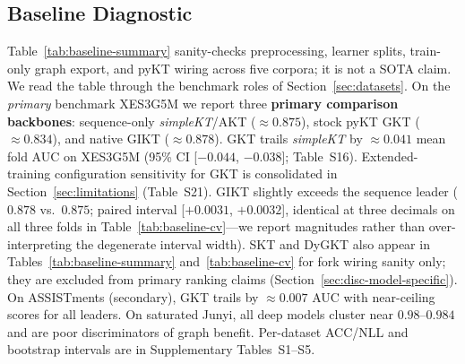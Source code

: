 \documentclass[pdflatex,sn-mathphys-num]{sn-jnl}
\newcommand{\GKTdeltaci}{[$-0.044$, $-0.038$]}
\newcommand{\GIKTdeltaci}{[$+0.0031$, $+0.0032$]}
\begin{document}
\subsection{Baseline Diagnostic}
\label{sec:exp-baseline}

Table~\ref{tab:baseline-summary} sanity-checks preprocessing, learner splits,
train-only graph export, and pyKT wiring across five corpora; it is not a SOTA
claim. We read the table through the benchmark roles of Section~\ref{sec:datasets}.
On the \emph{primary} benchmark XES3G5M we report three \textbf{primary
comparison backbones}: sequence-only \textit{simpleKT}/AKT (${\approx}0.875$),
stock pyKT GKT (${\approx}0.834$), and native GIKT (${\approx}0.878$).
GKT trails \textit{simpleKT} by ${\approx}0.041$ mean fold AUC on XES3G5M
(95\% CI \GKTdeltaci{}; Table~S16). Extended-training configuration
sensitivity for GKT is consolidated in Section~\ref{sec:limitations}
(Table~S21). GIKT slightly exceeds the sequence leader
($0.878$ vs.\ $0.875$; paired interval \GIKTdeltaci{}, identical at three
decimals on all three folds in Table~\ref{tab:baseline-cv}---we report
magnitudes rather than over-interpreting the degenerate interval width).
SKT and DyGKT also appear in Tables~\ref{tab:baseline-summary}
and~\ref{tab:baseline-cv} for fork wiring sanity only; they are excluded from
primary ranking claims (Section~\ref{sec:disc-model-specific}).
On ASSISTments (secondary), GKT trails by ${\approx}0.007$ AUC with
near-ceiling scores for all leaders. On saturated Junyi, all deep models
cluster near $0.98$--$0.984$ and are poor discriminators of graph benefit.
Per-dataset ACC/NLL and bootstrap intervals are in Supplementary Tables~S1--S5.
\end{document}
